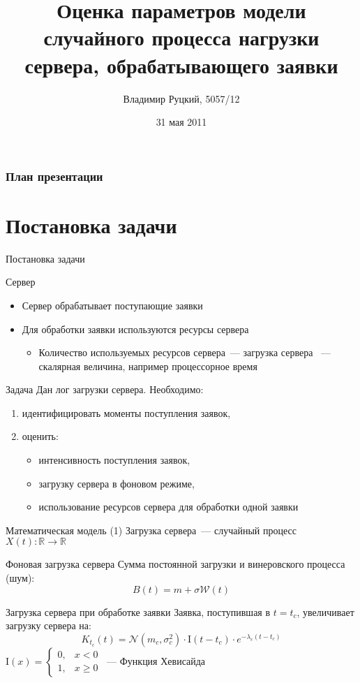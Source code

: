 \documentclass[utf8]{beamer}
\title[Оценка параметров случайного процесса]{Оценка параметров модели случайного процесса нагрузки сервера, обрабатывающего заявки}
\author{Владимир Руцкий, 5057/12}
\institute[СПбГПУ]{Санкт-Петербургский государственный политехнический университет}
\date{31 мая 2011}
\begin{document}
\begin{frame}
\titlepage
\end{frame}


\begin{frame}
\frametitle{План презентации}
\tableofcontents
\end{frame}


\section{Постановка задачи}
\begin{frame}{Постановка задачи}
\begin{block}{Сервер}
  \begin{itemize}
    \item Сервер обрабатывает поступающие заявки
    \item Для обработки заявки используются ресурсы сервера
      \begin{itemize}
        \item Количество используемых ресурсов сервера~--- загрузка сервера ~--- скалярная величина, например процессорное время
      \end{itemize}
  \end{itemize}
\end{block}

\begin{block}{Задача}
  Дан лог загрузки сервера. 
  Необходимо:
  \begin{enumerate}
    \item идентифицировать моменты поступления заявок,
    \item оценить:
      \begin{itemize}
        \item интенсивность поступления заявок,
        \item загрузку сервера в фоновом режиме,
        \item использование ресурсов сервера для обработки одной заявки
      \end{itemize}
  \end{enumerate}
\end{block}
\end{frame}


\begin{frame}{Математическая модель (1)}
Загрузка сервера~--- случайный процесс $X(t)\colon \mathbb{R} \rightarrow \mathbb{R}$
\begin{block}{Фоновая загрузка сервера}
  Сумма постоянной загрузки и винеровского процесса (шум): 
  $$B(t) = m + \sigma \mathcal{W}(t)$$
\end{block}
\begin{block}{Загрузка сервера при обработке заявки}
  Заявка, поступившая в $t=t_c$, увеличивает загрузку сервера на:
  $$K_{t_c}(t) = \mathcal{N}(m_c, \sigma_c^2) \cdot \mathrm{I}(t - t_c) \cdot 
    e^{-\lambda_c(t - t_c)}$$
  {\footnotesize $\mathrm{I}(x) = \left\{
    \begin{array}{rl}
      0, & x < 0 \\
      1, & x \geqslant 0
    \end{array}\right.$~--- Функция Хевисайда}
\end{block}
\end{frame}
\end{document}
